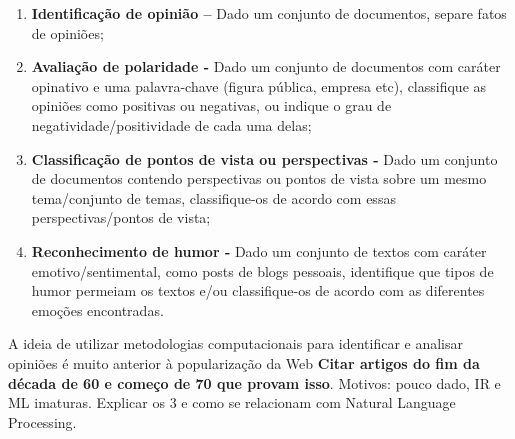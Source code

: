 \begin{enumerate}
   \item \textbf{Identificação de opinião –} Dado um conjunto de documentos, separe fatos de opiniões;
   \item \textbf{Avaliação de polaridade -} Dado um conjunto de documentos com caráter opinativo e uma palavra-chave (figura pública, empresa etc), classifique as opiniões como positivas ou negativas, ou indique o grau de negatividade/positividade de cada uma delas;
   \item \textbf{Classificação de pontos de vista ou perspectivas -} Dado um conjunto de documentos contendo perspectivas ou pontos de vista sobre um mesmo tema/conjunto de temas, classifique-os de acordo com essas perspectivas/pontos de vista;
   \item \textbf{Reconhecimento de humor -} Dado um conjunto de textos com caráter emotivo/sentimental, como posts de blogs pessoais, identifique que tipos de humor permeiam os textos e/ou classifique-os de acordo com as diferentes emoções encontradas.

\end{enumerate}



A ideia de utilizar metodologias computacionais para identificar e analisar opiniões é muito anterior à popularização da Web \textbf{Citar artigos do fim da década de 60 e começo de 70 que provam isso}. Motivos: pouco dado, IR e ML imaturas. Explicar os 3 e como se relacionam com Natural Language Processing.


